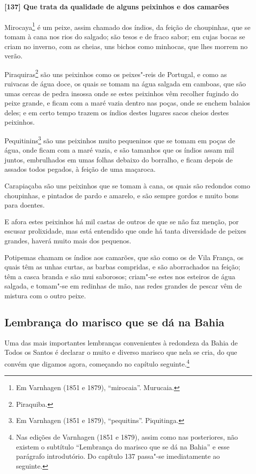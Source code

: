 \begin{linenumbers}
\paragraph{[137] Que trata da qualidade de alguns peixinhos e dos camarões}\quad
Mirocaya\footnote{ Em Varnhagen (1851 e 1879), ``mirocaia''. Murucaia.} é um peixe, assim
chamado dos índios, da feição de choupinhas, que se tomam à cana nos rios do salgado; são
tesos e de fraco sabor; em cujas bocas se criam no inverno, com as cheias, uns bichos como
minhocas, que lhes morrem no verão.

Piraquiras\footnote{ Piraquiba.} são uns peixinhos como os peixes"-reis de Portugal, e como
as ruivacas de água doce, os quais se tomam na água salgada em camboas, que são umas
cercas de pedra insossa onde se estes peixinhos vêm recolher fugindo do peixe grande, e
ficam com a maré vazia dentro nas poças, onde se enchem balaios deles; e em certo tempo
trazem os índios destes lugares sacos cheios destes peixinhos.

Pequitinins\footnote{ Em Varnhagen (1851 e 1879), ``pequitins''. Piquitinga.} são uns
peixinhos muito pequeninos que se tomam em poças de água, onde ficam com a maré vazia, e
são tamanhos que os índios assam mil juntos, embrulhados em umas folhas debaixo do
borralho, e ficam depois de assados todos pegados, à feição de uma maçaroca.

Carapiaçaba são uns peixinhos que se tomam à cana, os quais são redondos como choupinhas,
e pintados de pardo e amarelo, e são sempre gordos e muito bons para doentes.

E afora estes peixinhos há mil castas de outros de que se não faz menção, por escusar
prolixidade, mas está entendido que onde há tanta diversidade de peixes grandes, haverá
muito mais dos pequenos.

Potipemas chamam os índios aos camarões, que são como os de Vila França, os quais têm as
unhas curtas, as barbas compridas, e são aborrachados na feição; têm a casca branda e são
mui saborosos; criam"-se estes nos esteiros de água salgada, e tomam"-se em redinhas de mão,
nas redes grandes de pescar vêm de mistura com o outro peixe.

\subsection{Lembrança do marisco que se dá na Bahia}

Uma das mais importantes lembranças convenientes à redondeza da Bahia de Todos os Santos é
declarar o muito e diverso marisco que nela se cria, do que convém que digamos agora,
começando no capítulo seguinte.\footnote{ Nas edições de Varnhagen (1851 e 1879), assim
como nas posteriores, não existem o subtítulo ``Lembrança do marisco que se dá na Bahia''
e esse parágrafo introdutório. Do capítulo 137 passa"-se imediatamente ao seguinte.}


\end{linenumbers}
